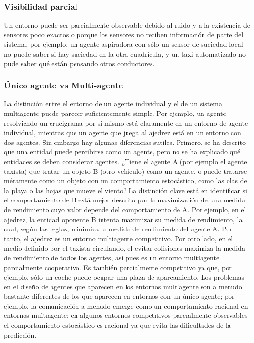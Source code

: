 \documentclass[12pt,a4paper]{report}
\begin{document}
\subsubsection{Visibilidad parcial}
Un entorno puede ser parcialmente observable debido al ruido y a la existencia de sensores poco exactos o porque los sensores no reciben información de parte del sistema, por ejemplo, un agente aspiradora con sólo un sensor de suciedad local no puede saber si hay suciedad en la otra cuadrícula, y un taxi automatizado no pude saber qué están pensando otros conductores.
\subsubsection{Único agente vs Multi-agente}
La distinción entre el entorno de un agente individual y el de un sistema multiagente puede parecer suficientemente simple. Por ejemplo, un agente resolviendo un crucigrama por sí mismo está claramente en un entorno de agente individual, mientras que un agente que juega al ajedrez está en un entorno con dos agentes. Sin embargo hay algunas diferencias sutiles. Primero, se ha descrito que una entidad puede percibirse como un agente, pero no se ha explicado qué entidades se deben considerar agentes. ¿Tiene el agente A (por ejemplo el agente taxista) que tratar un objeto B (otro vehículo) como un agente, o puede tratarse méramente como un objeto con un comportamiento estocástico, como las olas de la playa o las hojas que mueve el viento? La distinción clave está en identificar si el comportamiento de B está mejor descrito por la maximización de una medida de rendimiento cuyo valor depende del comportamiento de A. Por ejemplo, en el ajedrez, la entidad oponente B intenta maximizar su medida de rendimiento, la cual, según las reglas, minimiza la medida de rendimiento del agente A. Por tanto, el ajedrez es un entorno multiagente competitivo. Por otro lado, en el medio definido por el taxista circulando, el evitar colisiones maximiza la medida de rendimiento de todos los agentes, así pues es un entorno multiagente parcialmente cooperativo. Es también parcialmente competitivo ya que, por ejemplo, sólo un coche puede ocupar una plaza de aparcamiento. Los problemas en el diseño de agentes que aparecen en los entornos multiagente son a menudo bastante diferentes de los que aparecen en entornos con un único agente; por ejemplo, la comunicación a menudo emerge como un comportamiento racional en entornos multiagente; en algunos entornos competitivos parcialmente observables el comportamiento estocástico es racional ya que evita las dificultades de la predicción.
\end{document}
